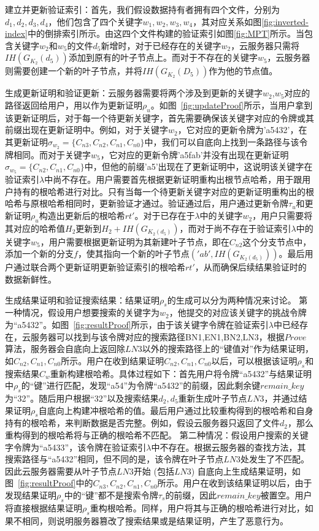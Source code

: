 {\heiti 建立并更新验证索引：}首先，我们假设数据持有者拥有四个文件，分别为$d_1,d_2,d_3,d_4$，他们包含了四个关键字$w_1,w_2,w_3,w_4$，其对应关系如图\ref{fig:inverted-index}中的倒排索引所示。由这四个文件构建的验证索引如图\ref{fig:MPT}所示。当包含关键字$w_2$和$w_5$的文件$d_5$新增时，对于已经存在的关键字$w_2$，云服务器只需将$IH(G_{K_2}(d_5))$添加到原有的叶子节点上。而对于不存在的关键字$w_5$，云服务器则需要创建一个新的叶子节点，并将$IH(G_{K_2}(D_5))$作为他的节点值。

{\heiti 生成更新证明和验证更新：}云服务器需要将两个涉及到更新的关键字$w_2$,$w_5$对应的路径返回给用户，用以作为更新证明$\rho_u$。如图~\ref{fig:updateProof}所示，当用户拿到该更新证明后，对于每一个待更新关键字，首先需要确保该关键字对应的令牌或其前缀出现在更新证明中。例如，对于关键字$w_2$，它对应的更新令牌为'a5432'，在其更新证明$\sigma_{w_2} = \{C_{n3},C_{n2},C_{n1},C_{n0}\}$中，我们可以自底向上找到一条路径与该令牌相同。而对于关键字$w_5$，它对应的更新令牌'a5fab'并没有出现在更新证明$\sigma_{w_5} = \{C_{n2},C_{n1},C_{n0}\}$中，但他的前缀'a5'出现在了更新证明中，这说明该关键字在验证索引$\lambda$中尚不存在。用户需要首先根据更新证明重构出根节点哈希，用于跟用户持有的根哈希进行对比。只有当每一个待更新关键字对应的更新证明重构出的根哈希与原根哈希相同时，更新验证才通过。验证通过后，用户通过更新令牌$\tau_u$和更新证明$\rho_u$构造出更新后的根哈希$rt'$。对于已存在于$\lambda$中的关键字$w_2$，用户只需要将其对应的哈希值$H_2$更新到$H_2+IH(G_{K_2(d_5)})$，而对于尚不存在于验证索引$\lambda$中的关键字$w_5$，用户需要根据更新证明为其新建叶子节点，即在$C_{n2}$这个分支节点中，添加一个新的分支$f$，使其指向一个新的叶子节点$('ab', IH(G_{K_2(d_5)}))$。最后用户通过联合两个更新证明更新验证索引的根哈希$rt'$，从而确保后续结果验证时的数据新鲜性。

{\heiti 生成结果证明和验证搜索结果：}结果证明$\rho_s$的生成可以分为两种情况来讨论。
第一种情况，假设用户想要搜索的关键字为$w_2$，他提交的对应该关键字的挑战令牌为“a5432”。如图~\ref{fig:resultProof}所示，由于该关键字令牌在验证索引$\lambda$中已经存在，云服务器可以找到与该令牌对应的搜索路径{BN1,EN1,BN2,LN3}，根据$Prove$算法，服务器会自底向上返回除$LN3$以外的搜索路径上的“键值对”作为结果证明，如$C_{n2},C_{n1},C_{n0}$所示。用户在收到结果证明$C_{n2},C_{n1},C_{n0}$以后，可以根据该证明$\rho_s$和搜索结果$C_w$重新构建根哈希。具体过程如下：首先用户将令牌“a5432”与结果证明中$\rho_s$的“键”进行匹配，发现“a54”为令牌“a5432”的前缀，因此剩余键$remain\_key$ 为“32”。随后用户根据“32”以及搜索结果$d_2,d_5$重新生成叶子节点$LN3$，并通过结果证明$\rho_s$自底向上构建冲根哈希的值。最后用户通过比较重构得到的根哈希和自身持有的根哈希，来判断数据是否完整。例如，假设云服务器只返回了文件$d_2$，那么重构得到的根哈希将与正确的根哈希不匹配。
第二种情况：假设用户搜索的关键字令牌为“a5433”，该令牌在验证索引$\lambda$中不存在。根据云服务器的查找方法，其搜索路径与“a5432”相同，但不同的是，该令牌在叶子节点$LN3$处发生了不匹配。因此云服务器需要从叶子节点$LN3$开始 (包括$LN3$) 自底向上生成结果证明，如图~\ref{fig:resultProof}中的$C_{n3},C_{n2},C_{n1},C_{n0}$所示。用户在收到该结果证明以后，由于发现结果证明$\rho_s$中的“键”都不是搜索令牌$\tau_s$的前缀，因此$remain\_key$被置空。用户将直接根据结果证明$\rho_s$重构根哈希。同样，用户将其与正确的根哈希进行对比，如果不相同，则说明服务器篡改了搜索结果或是结果证明，产生了恶意行为。


